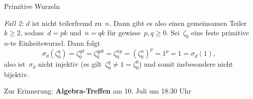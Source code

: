 \documentclass{algblatt}
\begin{document}
\begin{aufgabe}{Primitive Wurzeln}
\begin{loesungE}
\emph{Fall 2:} $d$ ist nicht teilerfremd zu~$n$. Dann gibt es also einen
gemeinsamen Teiler~$k \geq 2$, sodass~$d = pk$ und~$n = qk$ für gewisse~$p,q
\geq 0$. Sei~$\zeta_0$ eine feste primitive~$n$-te Einheitswurzel. Dann folgt
\[ \sigma_d(\zeta_0^q) = \zeta_0^{qd} = \zeta_0^{qpk} = \zeta_0^{np} =
(\zeta_0^n)^p = 1^p = 1 = \sigma_d(1), \]
also ist~$\sigma_d$ nicht injektiv (es gilt~$\zeta_0^q \neq 1 = \zeta_0^0$) und
somit insbesondere nicht bijektiv.
\end{loesungE}
\end{aufgabe}

Zur Erinnerung: \textbf{Algebra-Treffen} am 10. Juli um 18:30 Uhr
\end{document}
